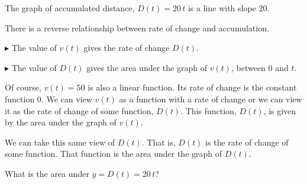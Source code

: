 \documentclass{ximera}
\begin{document}
The graph of accumulated distance, $D(t) = 20 \, t$ is a line with slope $20$.




\begin{image}
\end{image}
There is a reverse relationship between rate of change and accumulation.


$\blacktriangleright$ The value of $v(t)$ gives the rate of change $D(t)$.


$\blacktriangleright$ The value of $D(t)$ gives the area under the graph of $v(t)$, between $0$ and $t$.






Of course, $v(t) = 50$ is also a linear function. Its rate of change is the constant function $0$.  We can view $v(t)$ as a function with a rate of change or we can view it as the rate of change of some function, $D(t)$. This function, $D(t)$, is given by the area under the graph of $v(t)$.



We can take this same view of $D(t)$.  That is, $D(t)$ is the rate of change of some function.  That function is the area under the graph of $D(t)$.


What is the area under $y = D(t) = 20 \, t$?
\end{document}
